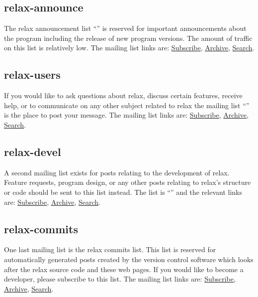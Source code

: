 \subsection{relax-announce}

The relax announcement list ``\relaxAnnounceML'' is reserved for important announcements about the program including the release of new program versions.
The amount of traffic on this list is relatively low.
The mailing list links are: \href{\relaxAnnounceMLSubscribeURL}{Subscribe}, \href{\relaxAnnounceMLArchiveURL}{Archive}, \href{\relaxAnnounceMLSearchURL}{Search}.


\subsection{relax-users} \label{sect: relax-users mailing list}

If you would like to ask questions about relax, discuss certain features, receive help, or to communicate on any other subject related to relax the mailing list ``\relaxUsersML'' is the place to post your message.
The mailing list links are: \href{\relaxUsersMLSubscribeURL}{Subscribe}, \href{\relaxUsersMLArchiveURL}{Archive}, \href{\relaxUsersMLSearchURL}{Search}.


\subsection{relax-devel} \label{sect: relax-devel mailing list}

A second mailing list exists for posts relating to the development of relax.
Feature requests, program design, or any other posts relating to relax's structure or code should be sent to this list instead.
The list is ``\relaxDevelML'' and the relevant links are:  \href{\relaxDevelMLSubscribeURL}{Subscribe}, \href{\relaxDevelMLArchiveURL}{Archive}, \href{\relaxDevelMLSearchURL}{Search}.


\subsection{relax-commits}

One last mailing list is the relax commits list.
This list is reserved for automatically generated posts created by the version control software which looks after the relax source code and these web pages.
If you would like to become a developer, please subscribe to this list.
The mailing list links are:  \href{\relaxCommitsMLSubscribeURL}{Subscribe}, \href{\relaxCommitsMLArchiveURL}{Archive}, \href{\relaxCommitsMLSearchURL}{Search}.


